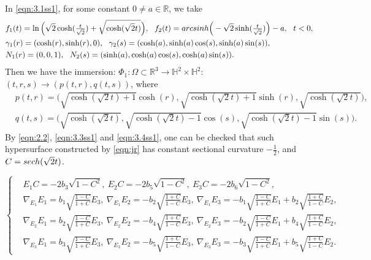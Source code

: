 \documentclass[10pt,a4paper]{amsart}
\begin{document}
\begin{example}\label{exam:4.1ss1ss11ab1}
In \eqref{eqn:3.1ss1}, for some constant $0\neq a\in \mathbb{R}$, we take
$$
\begin{aligned}
&f_1(t)=\ln\Big(\sqrt{2}\cosh(\tfrac{t}{\sqrt{2}})+\sqrt{\cosh(\sqrt{2}t)}\Big),\ \
f_2(t)={\rm arcsinh}\Big(-\sqrt{2}\sinh(\tfrac{t}{\sqrt{2}})\Big)-a,\ \ t<0,\\
&\gamma_1(r)=(\cosh(r),\sinh(r),0), \ \
\gamma_2(s)=(\cosh(a),\sinh(a)\cos(s),\sinh(a)\sin(s)),\\
&N_1(r)=(0,0,1),\ \ N_2(s)=(\sinh(a),\cosh(a)\cos(s),\cosh(a)\sin(s)).
\end{aligned}	
$$
Then we have the immersion:
$\Phi_1:\Omega\subset\mathbb{R}^3\rightarrow\mathbb{H}^2\times\mathbb{H}^2$:
$(t,r,s)\rightarrow(p(t,r),q(t,s))$, where %
%
\begin{equation}\label{eqn:jr}
\begin{aligned}
&p(t,r)=\Big(\sqrt{\cosh(\sqrt{2}t)+1}\cosh(r),\sqrt{\cosh(\sqrt{2}t)+1}\sinh(r),\sqrt{\cosh(\sqrt{2}t)}\Big),\\
&q(t,s)=\Big(\sqrt{\cosh(\sqrt{2}t)},\sqrt{\cosh(\sqrt{2}t)-1}\cos(s),\sqrt{\cosh(\sqrt{2}t)-1}\sin(s)\Big).
\end{aligned}	
\end{equation}
By \eqref{eqn:2.2}, \eqref{eqn:3.3ss1} and \eqref{eqn:3.4ss1}, one can be checked that such hypersurface constructed by \eqref{eqn:jr} has constant sectional curvature $-\frac{1}{2}$, and
$C={\rm sech}(\sqrt{2}t)$.
\end{example}

\begin{equation}\label{eqn:LL}
\left\{
\begin{aligned}
&E_1C=-2b_3\sqrt{1-C^2},\ E_2C=-2b_5\sqrt{1-C^2},\ E_3C=-2b_6\sqrt{1-C^2},\\ 		
&\nabla_{E_1}E_1=b_1\sqrt{\tfrac{1-C}{1+C}}E_3,\
\nabla_{E_1}E_2=-b_2\sqrt{\tfrac{1+C}{1-C}}E_3,\ \nabla_{E_1}E_3=-b_1\sqrt{\tfrac{1-C}{1+C}}E_1
+b_2\sqrt{\tfrac{1+C}{1-C}}E_2,\\
&\nabla_{E_2} E_1=b_2\sqrt{\tfrac{1-C}{1+C}}E_3,\
\nabla_{E_2} E_2=-b_4\sqrt{\tfrac{1+C}{1-C}}E_3,\ \nabla_{E_2}E_3=-b_2\sqrt{\tfrac{1-C}{1+C}}E_1
+b_4\sqrt{\tfrac{1+C}{1-C}}E_2,\\
&\nabla_{E_3}E_1=b_3\sqrt{\tfrac{1-C}{1+C}}E_3,\
\nabla_{E_3}E_2=-b_5\sqrt{\tfrac{1+C}{1-C}}E_3,\ \nabla_{E_3}E_3=-b_3\sqrt{\tfrac{1-C}{1+C}}E_1
+b_5\sqrt{\tfrac{1+C}{1-C}}E_2.
\end{aligned}\right.
\end{equation}
\end{document}
